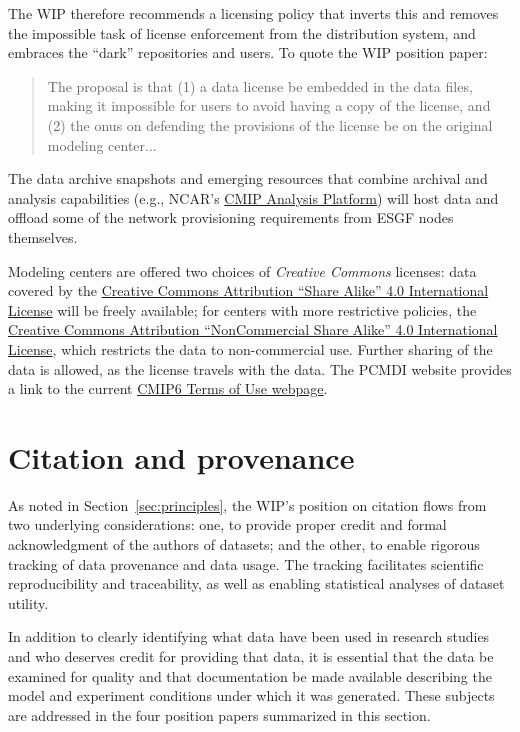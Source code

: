 \documentclass[gmd,manuscript]{copernicus}
\newcommand{\secref}[1] {\mbox{Section  \ref{sec:#1}}}
\begin{document}
The WIP therefore recommends a licensing policy that inverts this and
removes the impossible task of license enforcement from the distribution 
system, and embraces the ``dark'' repositories and users.
To quote the WIP position paper:

\begin{quote}
  The proposal is that (1) a data license be embedded in the data
  files, making it impossible for users to avoid having a copy of the
  license, and (2) the onus on defending the provisions of the license
  be on the original modeling center...
\end{quote}

The data archive snapshots and emerging resources that combine
archival and analysis capabilities (e.g., NCAR's
\href{https://goo.gl/sYTxC2}{CMIP Analysis Platform}) will host data
and offload some of the network provisioning requirements from ESGF
nodes themselves.

Modeling centers are offered two choices of \emph{Creative Commons}
licenses: data covered by the \href{https://goo.gl/CY5m2v}{Creative
  Commons Attribution ``Share Alike'' 4.0 International License} will
be freely available; for centers with more restrictive policies, the
\href{https://goo.gl/KUNUKq}{Creative Commons Attribution
  ``NonCommercial Share Alike'' 4.0 International License}, which
restricts the data to non-commercial use. Further sharing of the data
is allowed, as the license travels with the data. The PCMDI website
provides a link to the current
\href{https://pcmdi.llnl.gov/CMIP6/TermsOfUse}{CMIP6 Terms of Use
  webpage}.

\section{Citation and provenance}
\label{sec:cite}

As noted in \secref{principles}, the WIP's position on citation flows
from two underlying considerations: one, to provide proper credit and
formal acknowledgment of the authors of datasets; and the other, to
enable rigorous tracking of data provenance and data usage. The
tracking facilitates scientific reproducibility and traceability, as
well as enabling statistical analyses of dataset utility.

In addition to clearly identifying what data have been used in
research studies and who deserves credit for providing that data, it
is essential that the data be examined for quality and that
documentation be made available describing the model and experiment
conditions under which it was generated. These subjects are addressed
in the four position papers summarized in this section.
\end{document}
